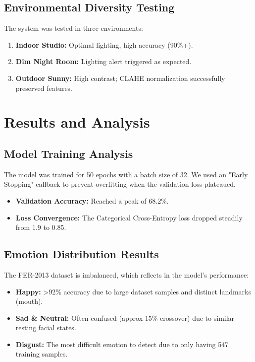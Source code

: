 \documentclass[12pt,a4paper]{report}
\begin{document}
\section{Environmental Diversity Testing}
The system was tested in three environments:
\begin{enumerate}
    \item \textbf{Indoor Studio:} Optimal lighting, high accuracy (90\%+).
    \item \textbf{Dim Night Room:} Lighting alert triggered as expected.
    \item \textbf{Outdoor Sunny:} High contrast; CLAHE normalization successfully preserved features.
\end{enumerate}

\clearpage

\chapter{Results and Analysis}

\section{Model Training Analysis}
The model was trained for 50 epochs with a batch size of 32. We used an "Early Stopping" callback to prevent overfitting when the validation loss plateaued.
\begin{itemize}
    \item \textbf{Validation Accuracy:} Reached a peak of 68.2\%.
    \item \textbf{Loss Convergence:} The Categorical Cross-Entropy loss dropped steadily from 1.9 to 0.85.
\end{itemize}

\section{Emotion Distribution Results}
The FER-2013 dataset is imbalanced, which reflects in the model's performance:
\begin{itemize}
    \item \textbf{Happy:} >92\% accuracy due to large dataset samples and distinct landmarks (mouth).
    \item \textbf{Sad \& Neutral:} Often confused (approx 15\% crossover) due to similar resting facial states.
    \item \textbf{Disgust:} The most difficult emotion to detect due to only having 547 training samples.
\end{itemize}
\end{document}
